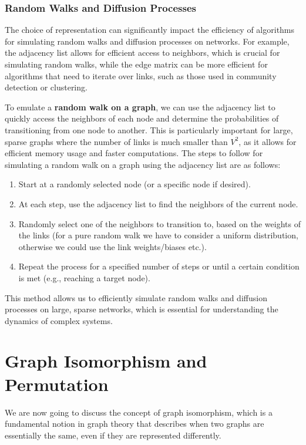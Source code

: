 \subsubsection{Random Walks and Diffusion Processes}

The choice of representation can significantly impact the efficiency of algorithms for simulating random walks and diffusion processes on networks. For example, the adjacency list allows for efficient access to neighbors, which is crucial for simulating random walks, while the edge matrix can be more efficient for algorithms that need to iterate over links, such as those used in community detection or clustering.

To emulate a \textbf{random walk on a graph}, we can use the adjacency list to quickly access the neighbors of each node and determine the probabilities of transitioning from one node to another. This is particularly important for large, sparse graphs where the number of links is much smaller than $V^2$, as it allows for efficient memory usage and faster computations. The steps to follow for simulating a random walk on a graph using the adjacency list are as follows:
\begin{enumerate}
    \item Start at a randomly selected node (or a specific node if desired).
    \item At each step, use the adjacency list to find the neighbors of the current node.
    \item Randomly select one of the neighbors to transition to, based on the weights of the links (for a pure random walk we have to consider a uniform distribution, otherwise we could use the link weights/biases etc.).
    \item Repeat the process for a specified number of steps or until a certain condition is met (e.g., reaching a target node).
\end{enumerate}
This method allows us to efficiently simulate random walks and diffusion processes on large, sparse networks, which is essential for understanding the dynamics of complex systems.

\section{Graph Isomorphism and Permutation}

We are now going to discuss the concept of graph isomorphism, which is a fundamental notion in graph theory that describes when two graphs are essentially the same, even if they are represented differently.

